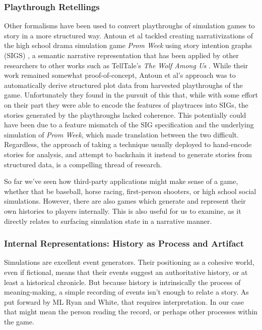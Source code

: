 \subsubsection{Playthrough Retellings}\label{subsubsec:playthrough-retellings}

Other formalisms have been used to convert playthroughs of simulation games to story in a more structured way. Antoun et al \cite{antoun2015generating} tackled creating narrativizations of the high school drama simulation game \textit{Prom Week} \cite{mccoy2012prom} using story intention graphs (SIGS) \cite{elson_SIG}, a semantic narrative representation that has been applied by other researchers to other works such as TellTale's \textit{The Wolf Among Us} \cite{Murray_wolf}. While their work remained somewhat proof-of-concept, Antoun et al's approach was to automatically derive structured plot data from harvested playthroughs of the game. Unfortunately they found in the pursuit of this that, while with some effort on their part they were able to encode the features of playtraces into SIGs, the stories generated by the playthroughs lacked coherence. This potentially could have been due to a feature mismatch of the SIG specification and the underlying simulation of \textit{Prom Week}, which made translation between the two difficult. Regardless, the approach of taking a technique usually deployed to hand-encode stories for analysis, and attempt to backchain it instead to generate stories from structured data, is a compelling thread of research.

So far we've seen how third-party applications might make sense of a game, whether that be baseball, horse racing, first-person shooters, or high school social simulations. However, there are also games which generate and represent their own histories to players internally. This is also useful for us to examine, as it directly relates to surfacing simulation state in a narrative manner.

\subsubsection{Internal Representations: History as Process and Artifact}\label{subsubsec:internal-representations}

Simulations are excellent event generators. Their positioning as a cohesive world, even if fictional, means that their events suggest an authoritative history, or at least a historical chronicle. But because history is intrinsically the process of meaning-making, a simple recording of events isn't enough to relate a story. As put forward by ML Ryan and White, that requires interpretation. In our case that might mean the person reading the record, or perhaps other processes within the game.


